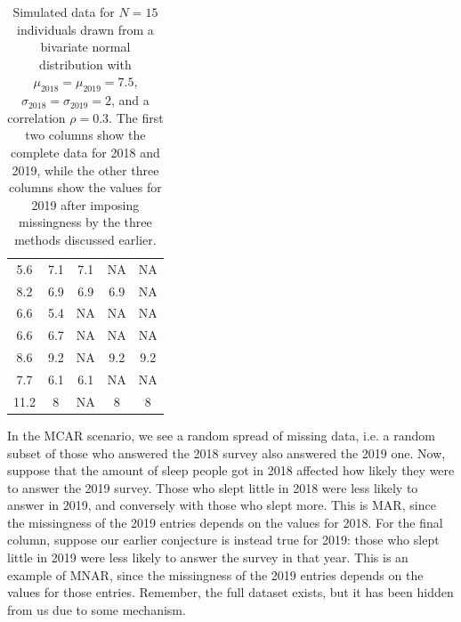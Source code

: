\documentclass{article}
\begin{document}
\begin{table}[]
\begin{tabular}{ccccc}
			5.6                      & 7.1                                 & 7.1                             & NA                             & NA                              \\
			8.2                      & 6.9                                 & 6.9                             & 6.9                            & NA                              \\
			6.6                      & 5.4                                 & NA                              & NA                             & NA                              \\
			6.6                      & 6.7                                 & NA                              & NA                             & NA                              \\
			8.6                      & 9.2                                 & NA                              & 9.2                            & 9.2                             \\
			7.7                      & 6.1                                 & 6.1                             & NA                             & NA                              \\
			11.2                     & 8                                   & NA                              & 8                              & 8                              
		\end{tabular}
	\caption{\label{tab:tab1}Simulated data for $N = 15$ individuals drawn from a bivariate normal distribution with $\mu_{2018} = \mu_{2019} = 7.5$, $\sigma_{2018} = \sigma_{2019} = 2$, and a correlation $\rho = 0.3$. The first two columns show the complete data for 2018 and 2019, while the other three columns show the values for 2019 after imposing missingness by the three methods discussed earlier.}
	\end{table}

	In the MCAR scenario, we see a random spread of missing data, i.e. a random subset of those who answered the 2018 survey also answered the 2019 one. Now, suppose that the amount of sleep people got in 2018 affected how likely they were to answer the 2019 survey. Those who slept little in 2018 were less likely to answer in 2019, and conversely with those who slept more. This is MAR, since the missingness of the 2019 entries depends on the values for 2018. For the final column, suppose our earlier conjecture is instead true for 2019: those who slept little in 2019 were less likely to answer the survey in that year. This is an example of MNAR, since the missingness of the 2019 entries depends on the values for those entries. Remember, the full dataset exists, but it has been hidden from us due to some mechanism.
	
\end{document}
